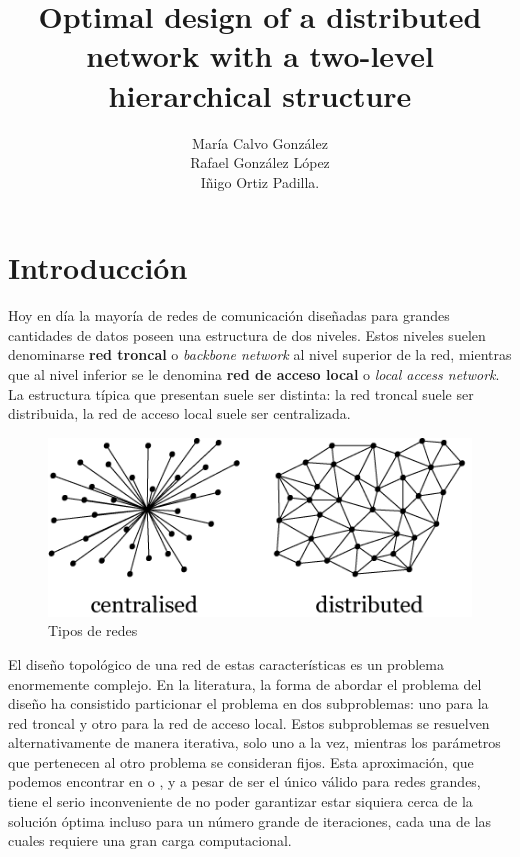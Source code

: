 \documentclass[twoside,12pt]{article}
\begin{document}
\title{Optimal design of a distributed network with a two-level hierarchical structure}
\author{María Calvo González\\ Rafael González López\\ Iñigo Ortiz Padilla.}
\maketitle
\section{Introducción}
Hoy en día la mayoría de redes de comunicación diseñadas para grandes cantidades de datos poseen una estructura de dos niveles. Estos niveles suelen denominarse \textbf{red troncal} o  \textit{backbone network} al nivel superior de la red, mientras que al nivel inferior se le denomina \textbf{red de acceso local} o \textit{local access network}. La estructura típica que presentan suele ser distinta: la red troncal suele ser distribuida, la red de acceso local suele ser centralizada.
\begin{figure}[h!]
\centering
\includegraphics[scale=0.55]{redes}
\caption{Tipos de redes}
\end{figure}

El diseño topológico de una red de estas características es un problema enormemente complejo. En la literatura, la forma de abordar el problema del diseño ha consistido particionar el problema en dos subproblemas: uno para la red troncal y otro para la red de acceso local. Estos subproblemas se resuelven alternativamente de manera iterativa, solo uno a la vez, mientras los parámetros que pertenecen al otro problema se consideran fijos. Esta aproximación, que podemos encontrar en \cite{bebesita} o \cite{bebesita2}, y a pesar de ser el único válido para redes grandes, tiene el serio inconveniente de no poder garantizar estar siquiera cerca de la solución óptima incluso para un número grande de iteraciones, cada una de las cuales requiere una gran carga computacional.
\end{document}
